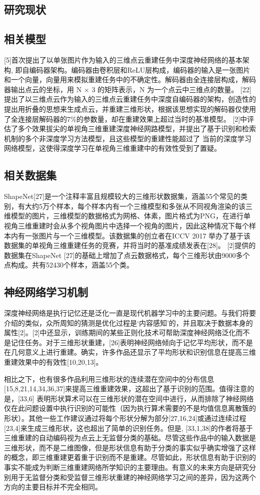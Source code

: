 \documentclass[bachelor, nocolorlinks, printoneside]{seuthesis} %
\begin{document}
\begin{Main}
\section{研究现状}
\subsection{相关模型}
[5]首次提出了以单张图片作为输入的三维点云重建任务中深度神经网络的基本架构, 即自编码器架构。编码器由卷积层和ReLU层构成，编码器的输入是一张图片和一个向量，向量用来模拟重建任务中的不确定性。解码器由全连接层构成，解码器输出点云的坐标，用 N × 3 的矩阵表示，N 为一个点云中三维点的数量。
[22]提出了以三维点云作为输入的三维点云重建任务中深度自编码器的架构，创造性的提出用折叠的思想来生成点云，并重建三维形状，根据该思想实现的解码器仅使用了全连接层解码器的7\%的参数量，却在重建效果上超过当时的基准模型。
[2]中评估了多个效果拔尖的单视角三维重建深度神经网路模型，并提出了基于识别和检索机制的多个非深度学习方法模型，且这些模型的重建性能超过了
当前的深度学习网络模型，这使得深度学习在单视角三维重建中的有效性受到了置疑。

\subsection{相关数据集}
ShapeNet[27]是一个注释丰富且规模较大的三维形状数据集，涵盖55个常见的类别，有大约5万个样本，每个样本内有一个三维模型和多张从不同视角渲染的该三维模型的图片，三维模型的数据格式为网格、体素，图片格式为PNG，在进行单视角三维重建时会从多个视角图片中选择一个视角的图片，因此这种情况下每个样本内有一张图片与一个三维模型。该数据集的创立者在ICCV 2017 举办了基于该数据集的单视角三维重建任务的竞赛，并将当时的基准成绩发表在[28]。
[2]提供的数据集在ShapeNet [27]的基础上增加了点云数据格式，每个三维形状由9000多个点构成。共有52430个样本，涵盖55个类。
\subsection{神经网络学习机制}
深度神经网络是执行记忆还是泛化一直是现代机器学习中的主要问题。与我们将要介绍的类似，众所周知的猜测是优化过程是‘内容感知’的，并且取决于数据本身的属性[2]。[2]中还显示，训练期间的某些正则化技术可帮助深度神经网络泛化而不是记住任务。对于三维形状重建，[26]表明神经网络倾向于记忆平均形状，而不是在几何意义上进行重建。确实，许多作品还显示了平均形状和识别信息在提高三维重建效果中的有效性[10,20,13]。

相比之下，也有很多作品利用三维形状的连续潜在空间中的分布信息 [15,8,21,14,34,36,37]来提高三维重建效果，这超出了基于识别的范围。值得注意的是，[33,6] 表明形状算术可以在三维形状的潜在空间中进行，从而排除了神经网络仅在此问题设置中执行识别的可能性（因为执行算术需要的不是均值信息离散簇的形状）。其他一些工作建议通过将每个形状分解为部分[27,16,24]或通过连续过程[23,4]来生成三维形状，这也超出了简单的识别任务。但是, [33,1,38]的作者将基于三维重建的自动编码视为点云上无监督分类的基础。尽管这些作品中的输入数据是三维形状，而不是二维图像，但是形状信息有助于分类的事实似乎确实增强了这样的概念，即三维重建更着重于识别而不是重建。尽管如此，形状信息有助于识别的事实不能成为判断三维重建网络所学知识的主要理由。有意义的未来方向是研究分别用于无监督分类和受监督三维形状重建的神经网络学习之间的差异，因为这两个方向的主要目标并不完全相同。


\end{Main}
\end{document}
